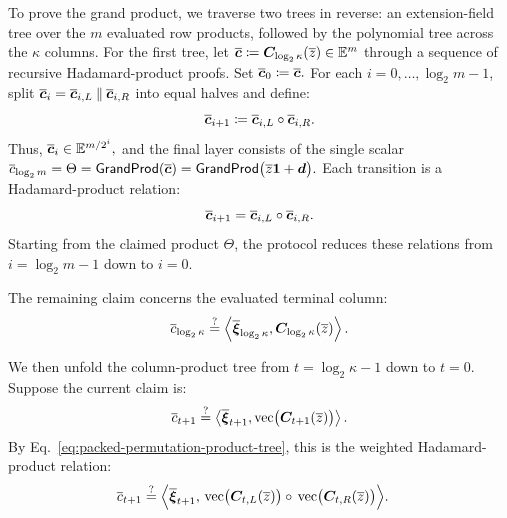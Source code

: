 To prove the grand product, we traverse two trees in reverse:
an extension-field tree over the \(m\) evaluated row products,
followed by the polynomial tree across the \(\kappa\) columns.
For the first tree, let
\(
    \overline{\bm c}
    \coloneqq
    \bm C_{\log_2\kappa}(\overline{z})
    \in\mathbb{E}^m
\)
through a sequence of recursive Hadamard-product proofs. Set
\(
    \overline{\bm c}_0
    \coloneqq
    \overline{\bm c}.
\)
For each \(i=0,\ldots,\log_2m-1\), split
\(
    \overline{\bm c}_i
    =
    \overline{\bm c}_{i,L}
    \mathbin{\|}
    \overline{\bm c}_{i,R}
\)
into equal halves and define:
\begin{equation*}
    \overline{\bm c}_{i+1}
    \coloneqq
    \overline{\bm c}_{i,L}
    \circ
    \overline{\bm c}_{i,R}.
\end{equation*}
Thus,
\(
    \overline{\bm c}_i
    \in
    \mathbb{E}^{m/2^i},
\)
and the final layer consists of the single scalar
\(
    \overline{c}_{\log_2m}
    =
    \Theta
    =
    \mathsf{GrandProd}(\overline{\bm c})
    =
    \mathsf{GrandProd}
    \bigl(\overline{z}\bm 1+\bm d\bigr).
\)
Each transition is a Hadamard-product relation:
\[
    \overline{\bm c}_{i+1}
    =
    \overline{\bm c}_{i,L}
    \circ
    \overline{\bm c}_{i,R}.
\]
Starting from the claimed product \(\Theta\), the protocol
reduces these relations from \(i=\log_2m-1\) down to \(i=0\).

The remaining claim concerns the evaluated terminal column:
\begin{equation*}
    \overline{c}_{\log_2 \kappa}
    \mathrel{\overset{\mathrm{?}}{=}}
    \left\langle
        \overline{\bm\xi}_{\log_2 \kappa},
        \bm C_{\log_2 \kappa}(\overline{z})
    \right\rangle.
\end{equation*}

We then unfold the column-product tree from
\(t=\log_2\kappa-1\) down to \(t=0\). Suppose the current
claim is:
\begin{equation*}
    \overline{c}_{t+1}
    \mathrel{\overset{\mathrm{?}}{=}}
    \left\langle
        \overline{\bm\xi}_{t+1},
        \operatorname{vec}
        \bigl(\bm C_{t+1}(\overline{z})\bigr)
    \right\rangle.
\end{equation*}
By Eq.~\eqref{eq:packed-permutation-product-tree}, this is the
weighted Hadamard-product relation:
\begin{equation}
\begin{aligned}
    \overline{c}_{t+1}
    \mathrel{\overset{\mathrm{?}}{=}}
    \Bigl\langle
        \overline{\bm\xi}_{t+1},\,
        &\operatorname{vec}
        \bigl(\bm C_{t,L}(\overline{z})\bigr)
        \circ\,
        \operatorname{vec}
        \bigl(\bm C_{t,R}(\overline{z})\bigr)
    \Bigr\rangle.
\end{aligned}
\label{eq:packed-permutation-hadamard-claim}
\end{equation}


